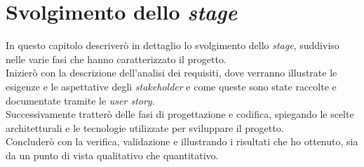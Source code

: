 \chapter{Svolgimento dello \textit{stage}}
\label{chap:svolgimento-stage}
\noindent
In questo capitolo descriverò in dettaglio lo svolgimento dello \textit{stage}, suddiviso nelle varie fasi che hanno caratterizzato il progetto.\\
Inizierò con la descrizione dell'analisi dei requisiti, dove verranno illustrate le esigenze e le aspettative degli \textit{stakeholder} e come queste sono state raccolte e documentate tramite le \textit{user story}.\\
Successivamente tratterò delle fasi di progettazione e codifica, spiegando le scelte architetturali e le tecnologie utilizzate per sviluppare il progetto.\\
Concluderò con la verifica, validazione e illustrando i risultati che ho ottenuto, sia da un punto di vista qualitativo che quantitativo.

